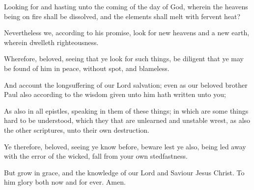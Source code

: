 {Looking
for
and hasting
unto the
coming of the
day of
God,
wherein the
heavens being on
fire shall be
dissolved,
and the
elements shall
melt with fervent
heat?

Nevertheless
we, according
to
his
promise, look
for
new
heavens
and a
new
earth,
wherein
dwelleth
righteousness.

Wherefore,
beloved, seeing that ye look
for such
things, be diligent
that ye may be
found of
him
in
peace, without
spot,
and
blameless.

And
account
{} the
longsuffering
of
our
Lord
{}
salvation; even
as
our
beloved
brother
Paul
also according
to the
wisdom
given unto
him hath
written unto
you;

As
also
in
all
{}
epistles,
speaking
in
them
of these
things;
in
which
are some
things hard to be
understood,
which they that are
unlearned
and
unstable
wrest,
as
{}
also the
other
scriptures,
unto
their
own
destruction.

Ye
therefore,
beloved, seeing ye
know
{}
before,
beware
lest ye
also, being led
away with the
error of the
wicked,
fall
from your
own
stedfastness.

But
grow
in
grace,
and
{} the
knowledge
of
our
Lord
and
Saviour
Jesus
Christ. To
him
{}
glory
both
now
and
for
ever.
Amen.


\par }